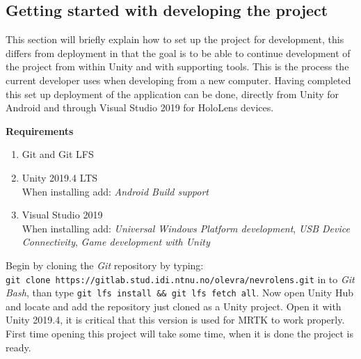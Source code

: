 \subsection*{Getting started with developing the project}
This section will briefly explain how to set up the project for development, this differs from deployment in that the goal is to be able to continue development of the project from within Unity and with supporting tools. This is the process the current developer uses when developing from a new computer.
Having completed this set up deployment of the application can be done, directly from Unity for Android and through Visual Studio 2019 for HoloLens devices.


\textbf{Requirements}
\begin{enumerate}
    \item Git and Git LFS
    \item { Unity 2019.4 LTS \\
    When installing add: \textit{Android Build support} }
    \item {Visual Studio 2019 \\
    When installing add: \textit{Universal Windows Platform development}, \textit{USB Device Connectivity}, \textit{Game development with Unity} }
\end{enumerate}
Begin by cloning the \textit{Git} repository by typing: \\ \texttt{git clone https://gitlab.stud.idi.ntnu.no/olevra/nevrolens.git} in to \textit{Git Bash}, than type \texttt{git lfs install \&\& git lfs fetch \-\-all}. Now open Unity Hub and locate and add the repository just cloned as a Unity project. Open it with Unity 2019.4, it is critical that this version is used for MRTK to work properly. First time opening this project will take some time, when it is done the project is ready.
